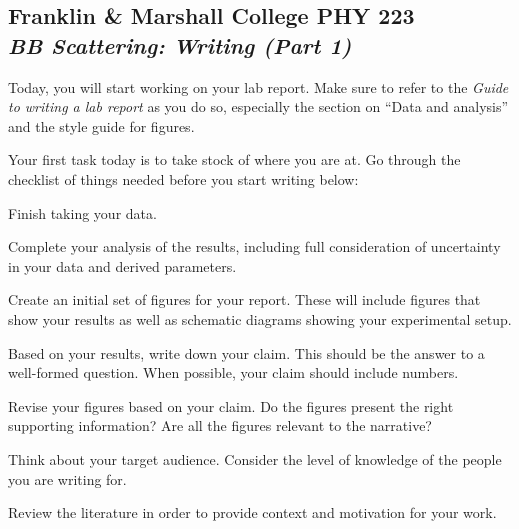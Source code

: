 \documentclass[11pt]{article}
\begin{document}
\begin{center}
\section*{
Franklin \& Marshall College \hfill PHY 223\\
\bigskip
{\Large \it BB Scattering: Writing  (Part 1)}}
\end{center}

Today, you will start working on your lab report. Make sure to refer to the \textit{Guide to writing a lab report} as you do so, especially the section on ``Data and analysis'' and the style guide for figures.

\vspace{3mm}


\vspace{3mm}

Your first task today is to take stock of where you are at. Go through the checklist of things needed before you start writing below:

\vspace{3mm}

\begin{todolist}

\item Finish taking your data.

\item Complete your analysis of the results, including full consideration of uncertainty in your data and derived parameters.

\item Create an initial set of figures for your report. These will include figures that show your results as well as schematic diagrams showing your experimental setup.

\item Based on your results, write down your claim. This should
  be the answer to a well-formed question. When possible, your claim
  should include numbers.

\item Revise your figures based on your claim. Do the figures present the
  right supporting information? Are all the figures relevant to the narrative?

  \item Think about your target audience. Consider the level of knowledge
 of the people you are writing for.

\item Review the literature in order to provide context and motivation for your work.

\end{todolist}
\end{document}
